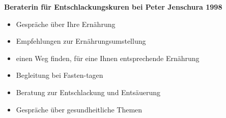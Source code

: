 \documentclass[10pt,foldmark,notumble]{leaflet}
\begin{document}
\vspace{2mm}

{\bf Beraterin für Entschlackungskuren bei Peter Jenschura 1998}\\
\begin{itemize}
\item  Gespräche über Ihre Ernährung
\item  Empfehlungen zur Ernährungsumstellung
\item  einen Weg finden, für eine Ihnen entsprechende Ernährung
\item  Begleitung bei Fasten-tagen
\item  Beratung zur Entschlackung und Entsäuerung
\item  Gespräche über gesundheitliche Themen
\end{itemize}




\end{document}
